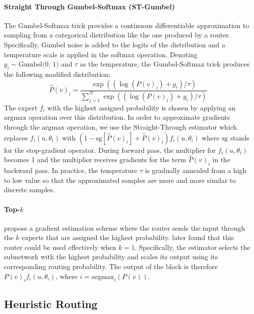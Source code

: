 \documentclass{article}
\theoremstyle{plain}
\theoremstyle{definition}
\theoremstyle{remark}
\begin{document}
\paragraph{Straight Through Gumbel-Softmax (ST-Gumbel)}  
The Gumbel-Softmax trick \citep{jang2016categorical} provides a continuous differentiable approximation to sampling from a categorical distribution like the one produced by a router.
Specifically, Gumbel noise is added to the logits of the distribution and a temperature scale is applied in the softmax operation.
Denoting $g_i \sim \text{Gumbel(0, 1)}$ and $\tau$ as the temperature, the Gumbel-Softmax trick produces the following modified distribution:
\begin{equation}
\label{eq:st_gumbel_estimator_eq}
    \hat{P}(v)_i = \frac{\exp((\log(P(v)_i) + g_i)/\tau)}{\sum_{j = 1}^N \exp((\log(P(v)_i) + g_i)/\tau)}
\end{equation}
The expert $f_i$ with the highest assigned probability is chosen by applying an $\text{argmax}$ operation over this distribution.
In order to approximate gradients through the $\text{argmax}$ operation, we use the Straight-Through estimator which replaces $f_i(u, \theta_i)$ with $(1 - \text{sg}[\hat{P}(v)_i] + \hat{P}(v)_i) f_i(u, \theta_i)$ where $\text{sg}$ stands for the stop-gradient operator.
During forward pass, the multiplier for $f_i(u, \theta_i)$ becomes 1 and the multiplier receives gradients for the term $\hat{P}(v)_i$ in the backward pass.
In practice, the temperature $\tau$ is gradually annealed from a high to low value so that the approximated samples are more and more similar to discrete samples.

\paragraph{Top-$k$}
\citet{shazeer2017outrageously} propose a gradient estimation scheme where the router sends the input through the $k$ experts that are assigned the highest probability.
\citet{fedus2021switch} later found that this router could be used effectively when $k = 1$. 
Specifically, the estimator selects the subnetwork with the highest probability and scales its output using its corresponding routing probability.
The output of the block is therefore $P(v)_i f_i(u, \theta_i)$, where $i= \mathrm{argmax}_i (P(v))$.

\subsection{Heuristic Routing}
\label{sec:heuristic}
\end{document}
